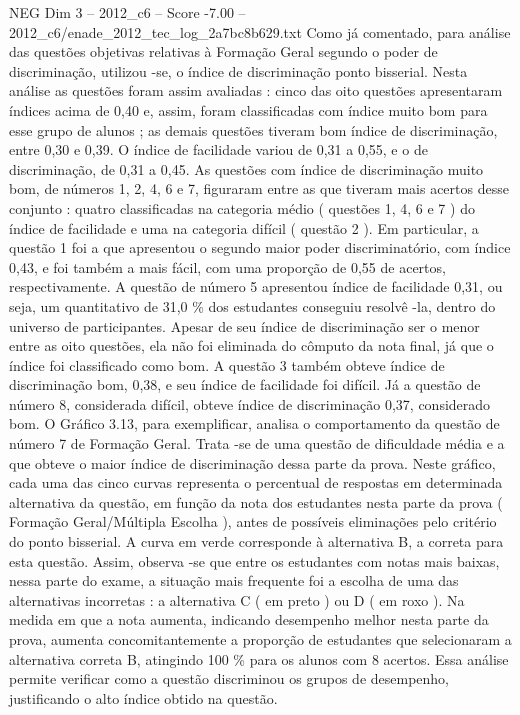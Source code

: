\begin{textsample}{NEG Dim 3 – 2012\_c6 – Score -7.00 – 2012\_c6/enade\_2012\_tec\_log\_2a7bc8b629.txt}
Como já comentado, para análise das questões objetivas relativas à Formação Geral segundo o poder de discriminação, utilizou -se, o índice de discriminação ponto bisserial.
Nesta análise as questões foram assim avaliadas : cinco das oito questões apresentaram índices acima de 0,40 e, assim, foram classificadas com índice muito bom para esse grupo de alunos ; as demais questões tiveram bom índice de discriminação, entre 0,30 e 0,39.
O índice de facilidade variou de 0,31 a 0,55, e o de discriminação, de 0,31 a 0,45.
As questões com índice de discriminação muito bom, de números 1, 2, 4, 6 e 7, figuraram entre as que tiveram mais acertos desse conjunto : quatro classificadas na categoria médio ( questões 1, 4, 6 e 7 ) do índice de facilidade e uma na categoria difícil ( questão 2 ).
Em particular, a questão 1 foi a que apresentou o segundo maior poder discriminatório, com índice 0,43, e foi também a mais fácil, com uma proporção de 0,55 de acertos, respectivamente.
A questão de número 5 apresentou índice de facilidade 0,31, ou seja, um quantitativo de 31,0 \% dos estudantes conseguiu resolvê -la, dentro do universo de participantes.
Apesar de seu índice de discriminação ser o menor entre as oito questões, ela não foi eliminada do cômputo da nota final, já que o índice foi classificado como bom.
A questão 3 também obteve índice de discriminação bom, 0,38, e seu índice de facilidade foi difícil.
Já a questão de número 8, considerada difícil, obteve índice de discriminação 0,37, considerado bom.
O Gráfico 3.13, para exemplificar, analisa o comportamento da questão de número 7 de Formação Geral.
Trata -se de uma questão de dificuldade média e a que obteve o maior índice de discriminação dessa parte da prova.
Neste gráfico, cada uma das cinco curvas representa o percentual de respostas em determinada alternativa da questão, em função da nota dos estudantes nesta parte da prova ( Formação Geral/Múltipla Escolha ), antes de possíveis eliminações pelo critério do ponto bisserial.
A curva em verde corresponde à alternativa B, a correta para esta questão.
Assim, observa -se que entre os estudantes com notas mais baixas, nessa parte do exame, a situação mais frequente foi a escolha de uma das alternativas incorretas : a alternativa C ( em preto ) ou D ( em roxo ).
Na medida em que a nota aumenta, indicando desempenho melhor nesta parte da prova, aumenta concomitantemente a proporção de estudantes que selecionaram a alternativa correta B, atingindo 100 \% para os alunos com 8 acertos.
Essa análise permite verificar como a questão discriminou os grupos de desempenho, justificando o alto índice obtido na questão.

\end{textsample}

